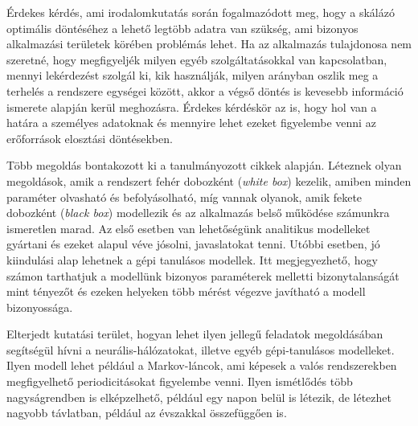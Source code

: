 Érdekes kérdés, ami irodalomkutatás során fogalmazódott meg, hogy a skálázó optimális döntéséhez a lehető legtöbb adatra van szükség, ami bizonyos alkalmazási területek körében problémás lehet.
Ha az alkalmazás tulajdonosa nem szeretné, hogy megfigyeljék milyen egyéb szolgáltatásokkal van kapcsolatban, mennyi lekérdezést szolgál ki, kik használják, milyen arányban oszlik meg a terhelés a rendszere egységei között, akkor a végső döntés is kevesebb információ ismerete alapján kerül meghozásra.
Érdekes kérdéskör az is, hogy hol van a határa a személyes adatoknak és mennyire lehet ezeket figyelembe venni az erőforrások elosztási döntésekben.

Több megoldás bontakozott ki a tanulmányozott cikkek alapján. Léteznek olyan megoldások, amik a rendszert fehér dobozként (\textit{white box}) kezelik, amiben minden paraméter olvasható és befolyásolható, míg vannak olyanok, amik fekete dobozként (\textit{black box}) modellezik és az alkalmazás belső működése számunkra ismeretlen marad\citep{TowardsAnAdaptive}. Az első esetben van lehetőségünk analitikus modelleket gyártani és ezeket alapul véve jósolni, javaslatokat tenni. Utóbbi esetben, jó kiindulási alap lehetnek a gépi tanulásos modellek. Itt megjegyezhető, hogy számon tarthatjuk a modellünk bizonyos paraméterek melletti bizonytalanságát mint tényezőt és ezeken helyeken több mérést végezve javítható a modell bizonyossága\citep{TowardsAnAdaptive}.

Elterjedt kutatási terület, hogyan lehet ilyen jellegű feladatok megoldásában segítségül hívni a neurális-hálózatokat, illetve egyéb gépi-tanulásos modelleket. Ilyen modell lehet például a Markov-láncok, ami képesek a valós rendszerekben megfigyelhető periodicitásokat figyelembe venni\citep{CloudScale}. Ilyen ismétlődés több nagyságrendben is elképzelhető, például egy napon belül is létezik, de létezhet nagyobb távlatban, például az évszakkal összefüggően is\citep{PredictingUsageAndProactiveScaling}.




